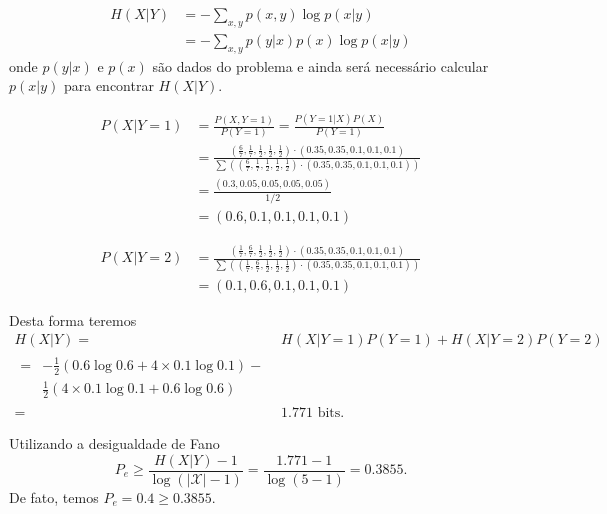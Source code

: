 \begin{example}
  \begin{subequations}
    \begin{align}
      H(X|Y) &= - \sum_{x,y} p(x,y) \log p(x|y) \\
         &= - \sum_{x,y} p(y|x) p(x) \log p(x|y)
    \end{align}
  \end{subequations}
  onde $p(y|x)$ e $p(x)$ são dados do problema e ainda será necessário calcular $p(x|y)$ para encontrar $H(X|Y)$.

  \begin{subequations}
    \begin{align}
      P(X|Y=1) &= \frac{P(X,Y=1)}{P(Y=1)} = \frac{P(Y=1|X)P(X)}{P(Y=1)} \\
        &= \frac{(\frac{6}{7}, \frac{1}{7}, \frac{1}{2}, \frac{1}{2}, \frac{1}{2}) \cdot (0.35, 0.35, 0.1, 0.1, 0.1) }{ \sum \left( (\frac{6}{7}, \frac{1}{7}, \frac{1}{2}, \frac{1}{2}, \frac{1}{2}) \cdot (0.35, 0.35, 0.1, 0.1, 0.1)  \right)  } \\
        &= \frac{(0.3, 0.05, 0.05, 0.05, 0.05)}{1/2} \\
        &= (0.6, 0.1, 0.1, 0.1, 0.1)
    \end{align}
  \end{subequations}

  \begin{subequations}
    \begin{align}
      P(X|Y=2) &= \frac{(\frac{1}{7}, \frac{6}{7}, \frac{1}{2}, \frac{1}{2}, \frac{1}{2}) \cdot (0.35, 0.35, 0.1, 0.1, 0.1) }{ \sum \left( (\frac{1}{7}, \frac{6}{7}, \frac{1}{2}, \frac{1}{2}, \frac{1}{2}) \cdot (0.35, 0.35, 0.1, 0.1, 0.1)  \right)  } \\
        &= (0.1, 0.6, 0.1, 0.1, 0.1)
    \end{align}
  \end{subequations}

  Desta forma teremos
  \begin{subequations}
    \begin{align}
      H(X|Y) ={}& H(X|Y=1) P(Y=1) + H(X|Y=2) P(Y=2)  \\
      \begin{split}
        ={}& - \frac{1}{2} \left( 0.6 \log 0.6 + 4 \times 0.1 \log 0.1 \right) - \\
           & \frac{1}{2} \left( 4 \times 0.1 \log 0.1 + 0.6 \log 0.6 \right) 
      \end{split}\\
        ={}& 1.771 \text{ bits. }
    \end{align}
  \end{subequations}

  Utilizando a desigualdade de Fano
  \begin{equation}
    P_e \geq \frac{H(X|Y) - 1}{\log \left( \vert \mathcal{X} \vert -1 \right)} = \frac{1.771 - 1}{ \log (5-1)} = 0.3855.
  \end{equation}
  De fato, temos $P_e = 0.4 \geq 0.3855$.
  \end{example}










